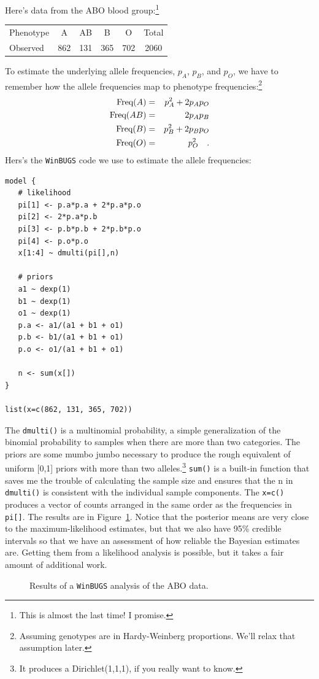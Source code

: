 \documentclass[12pt]{article}
\begin{document}
Here's data from the ABO blood group:\footnote{This is almost the last
time! I promise.}
\begin{center}
\begin{tabular}{l|ccccc}
\hline\hline
Phenotype &   A &  AB &   B &   O & Total \\
Observed  & 862 & 131 & 365 & 702 & 2060 \\
\hline
\end{tabular}
\end{center}
To estimate the underlying allele frequencies, $p_A$, $p_B$, and
$p_O$, we have to remember how the allele frequencies map to phenotype
frequencies:\footnote{Assuming genotypes are in Hardy-Weinberg
  proportions. We'll relax that assumption later.}
\begin{eqnarray*}
\hbox{Freq}(A) &=& p_A^2 + 2p_Ap_O \\
\hbox{Freq}(AB) &=& 2p_Ap_B \\
\hbox{Freq}(B) &=& p_B^2 + 2p_Bp_O \\
\hbox{Freq}(O) &=& p_O^2 \quad .
\end{eqnarray*}
Hers's the {\tt WinBUGS} code we use to estimate the allele
frequencies:
\begin{verbatim}
model {
   # likelihood 
   pi[1] <- p.a*p.a + 2*p.a*p.o
   pi[2] <- 2*p.a*p.b
   pi[3] <- p.b*p.b + 2*p.b*p.o
   pi[4] <- p.o*p.o
   x[1:4] ~ dmulti(pi[],n)

   # priors
   a1 ~ dexp(1)
   b1 ~ dexp(1)
   o1 ~ dexp(1)
   p.a <- a1/(a1 + b1 + o1)
   p.b <- b1/(a1 + b1 + o1)
   p.o <- o1/(a1 + b1 + o1)

   n <- sum(x[])
}

list(x=c(862, 131, 365, 702))
\end{verbatim}
The {\tt dmulti()} is a multinomial probability, a simple
generalization of the binomial probability to samples when there are
more than two categories. The priors are some mumbo jumbo necessary to
produce the rough equivalent of uniform [0,1] priors with more than
two alleles.\footnote{It produces a Dirichlet(1,1,1), if you really
  want to know.} {\tt sum()} is a built-in function that saves me the
trouble of calculating the sample size and ensures that the n in {\tt
  dmulti()} is consistent with the individual sample components. The
{\tt x=c()} produces a vector of counts arranged in the same order as
the frequencies in {\tt pi[]}. The results are in Figure~\ref{fig:abo}.
Notice that the posterior means are very close to the
maximum-likelihood estimates, but that we also have 95\% credible
intervals so that we have an assessment of how reliable the Bayesian
estimates are. Getting them from a likelihood analysis is possible,
but it takes a fair amount of additional work.

\begin{figure}
\begin{center}
\end{center}
\caption{Results of a {\tt WinBUGS} analysis of the ABO data.}
\label{fig:abo}
\end{figure}




\ccLicense
\end{document}
